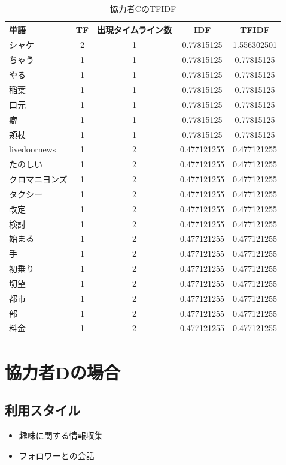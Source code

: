 \begin{table}[H]
	\centering
	\caption{協力者CのTFIDF}
	\begin{tabular}{l|c|c|c|c}
		単語 & TF & 出現タイムライン数 & IDF & TFIDF \\ \hline
		シャケ & 2 & 1 & 0.77815125 & 1.556302501 \\
		ちゃう & 1 & 1 & 0.77815125 & 0.77815125 \\
		やる & 1 & 1 & 0.77815125 & 0.77815125 \\
		稲葉 & 1 & 1 & 0.77815125 & 0.77815125 \\
		口元 & 1 & 1 & 0.77815125 & 0.77815125 \\
		癖 & 1 & 1 & 0.77815125 & 0.77815125 \\
		頬杖 & 1 & 1 & 0.77815125 & 0.77815125 \\
		livedoornews & 1 & 2 & 0.477121255 & 0.477121255 \\
		たのしい & 1 & 2 & 0.477121255 & 0.477121255 \\
		クロマニヨンズ & 1 & 2 & 0.477121255 & 0.477121255 \\
		タクシー & 1 & 2 & 0.477121255 & 0.477121255 \\
		改定 & 1 & 2 & 0.477121255 & 0.477121255 \\
		検討 & 1 & 2 & 0.477121255 & 0.477121255 \\
		始まる & 1 & 2 & 0.477121255 & 0.477121255 \\
		手 & 1 & 2 & 0.477121255 & 0.477121255 \\
		初乗り & 1 & 2 & 0.477121255 & 0.477121255 \\
		切望 & 1 & 2 & 0.477121255 & 0.477121255 \\
		都市 & 1 & 2 & 0.477121255 & 0.477121255 \\
		部 & 1 & 2 & 0.477121255 & 0.477121255 \\
		料金 & 1 & 2 & 0.477121255 & 0.477121255
	\end{tabular}
\end{table}

\section{協力者Dの場合}

\subsection{利用スタイル}
\begin{itemize}
	\item 趣味に関する情報収集
	\item フォロワーとの会話
\end{itemize}

